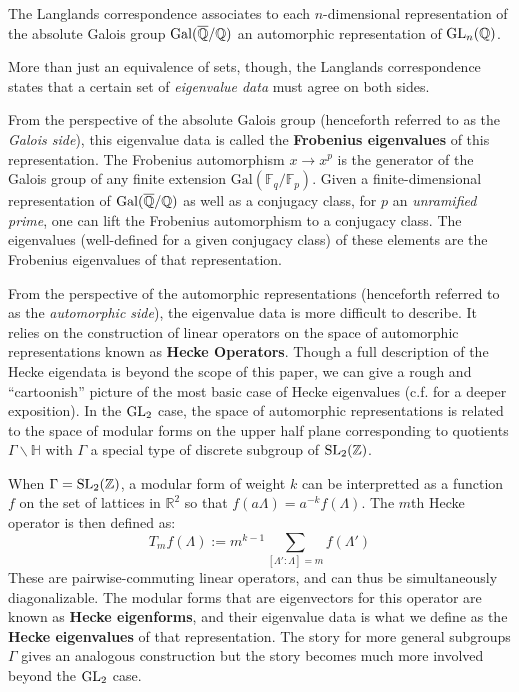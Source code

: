 \begin{idea}
	The Langlands correspondence associates to each $n$-dimensional representation of the absolute Galois group $\mathrm{Gal}(\overline {\mathbb{Q}}/\mathbb{Q})$ an automorphic representation of $\mathrm{GL}_n(\mathbb{Q})$.
\end{idea}
More than just an equivalence of sets, though, the Langlands correspondence states that a certain set of \emph{eigenvalue data} must agree on both sides. 

From the perspective of the absolute Galois group (henceforth referred to as the \emph{Galois side}), this eigenvalue data is called the \textbf{Frobenius eigenvalues} of this representation. The Frobenius automorphism $x \to x^p$ is the generator of the Galois group of any finite extension $\mathrm{Gal}(\mathbb F_q/\mathbb F_p)$. Given a finite-dimensional representation of $\mathrm{Gal}(\overline {\mathbb{Q}}/\mathbb{Q})$ as well as a conjugacy class, for $p$ an \emph{unramified prime}, one can lift the Frobenius automorphism to a conjugacy class. The eigenvalues (well-defined for a given conjugacy class) of these elements are the Frobenius eigenvalues of that representation. 

From the perspective of the automorphic representations (henceforth referred to as the \emph{automorphic side}), the eigenvalue data is more difficult to describe. It relies on the construction of linear operators on the space of automorphic representations known as \textbf{Hecke Operators}. Though a full description of the Hecke eigendata is beyond the scope of this paper, we can give a rough and ``cartoonish'' picture of the most basic case of Hecke eigenvalues (c.f. \cite{miyake1971, kudla2004} for a deeper exposition). In the $\mathrm{GL}_2$ case, the space of automorphic representations is related to the space of modular forms on the upper half plane corresponding to quotients $\Gamma \backslash \mathbb H$ with $\Gamma$ a special type of discrete subgroup of $\mathrm{SL}_2(\mathbb Z)$. 

When $\Gamma = \mathrm{SL}_2(\mathbb Z)$, a modular form of weight $k$ can be interpretted as a function $f$ on the set of lattices in $\mathbb R^2$ so that $f(a\Lambda) = a^{-k} f(\Lambda)$.
The $m$th Hecke operator is then defined as:
\[
	T_m f (\Lambda) := m^{k-1} \sum_{[\Lambda' : \Lambda] = m} f(\Lambda')
\]
These are pairwise-commuting linear operators, and can thus be simultaneously diagonalizable. 
The modular forms that are eigenvectors for this operator are known as \textbf{Hecke eigenforms}, and their eigenvalue data is what we define as the \textbf{Hecke eigenvalues} of that representation. The story for more general subgroups $\Gamma$ gives an analogous construction but the story becomes much more involved beyond the $\mathrm{GL}_2$ case.


